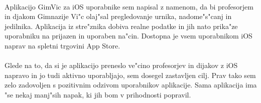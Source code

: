 \paragraph{}Aplikacijo GimVic za iOS uporabnike sem napisal z namenom, da bi profesorjem in djakom Gimnazije Vi"c olaj"sal pregledovanje urnika, nadome"s"canj in jedilnika. Aplikacija iz stre"znika dobiva realne podatke in jih nato prika"ze uporabniku na prijazen in uporaben na"cin. Dostopna je vsem uporabnikom iOS naprav na spletni trgovini App Store.

\paragraph{}Glede na to, da si je aplikacijo preneslo ve"cino profesorjev in dijakov z iOS napravo in jo tudi aktivno uporabljajo, sem dosegel zastavljen cilj. Prav tako sem zelo zadovoljen s pozitivnim odzivom uporabnikov aplikacije. Sama aplikacija ima "se nekaj manj"sih napak, ki jih bom v prihodnosti popravil.
